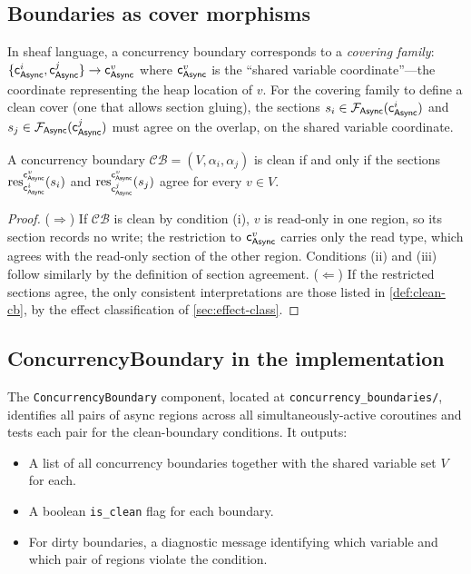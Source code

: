 \documentclass[11pt]{article}
\newcommand{\Async}{\mathsf{Async}}          %
\newcommand{\CB}{\mathcal{CB}}               %
\newcommand{\asyncCoord}[1]{\coord_{\Async}^{#1}} %
\newcommand{\asyncSheaf}{\mathcal{F}_{\Async}} %
\newcommand{\asyncRegion}[1]{\alpha_{#1}}    %
\providecommand{\restriction}[2]{\res_{#1}^{#2}} %
\begin{document}
\subsection{Boundaries as cover morphisms}

In sheaf language, a concurrency boundary corresponds to a \emph{covering
family}: $\{\asyncCoord{i}, \asyncCoord{j}\} \to \asyncCoord{v}$ where
$\asyncCoord{v}$ is the ``shared variable coordinate''---the coordinate
representing the heap location of $v$.  For the covering family to define
a clean cover (one that allows section gluing), the sections
$s_i \in \asyncSheaf(\asyncCoord{i})$ and $s_j \in \asyncSheaf(\asyncCoord{j})$
must agree on the overlap, \ie on the shared variable coordinate.

\begin{proposition}\label{prop:boundary-compat}
A concurrency boundary $\CB = (V, \asyncRegion{i}, \asyncRegion{j})$ is clean
if and only if the sections
$\restriction{\asyncCoord{i}}{\asyncCoord{v}}(s_i)$
and
$\restriction{\asyncCoord{j}}{\asyncCoord{v}}(s_j)$
agree for every $v \in V$.
\end{proposition}
\begin{proof}
($\Rightarrow$) If $\CB$ is clean by condition (i), $v$ is read-only in
one region, so its section records no write; the restriction to
$\asyncCoord{v}$ carries only the read type, which agrees with the
read-only section of the other region.  Conditions (ii) and (iii) follow
similarly by the definition of section agreement.
($\Leftarrow$) If the restricted sections agree, the only consistent
interpretations are those listed in \cref{def:clean-cb}, by the effect
classification of \cref{sec:effect-class}.
\end{proof}

\subsection{ConcurrencyBoundary in the implementation}

The \texttt{ConcurrencyBoundary} component, located at
\texttt{concurrency\_boundaries/}, identifies all pairs of async regions
across all simultaneously-active coroutines and tests each pair for the
clean-boundary conditions.  It outputs:
\begin{itemize}
  \item A list of all concurrency boundaries together with the shared
        variable set $V$ for each.
  \item A boolean \texttt{is\_clean} flag for each boundary.
  \item For dirty boundaries, a diagnostic message identifying which
        variable and which pair of regions violate the condition.
\end{itemize}
\end{document}
